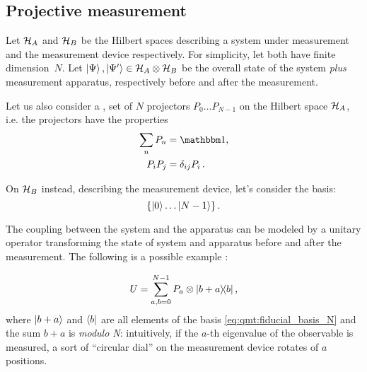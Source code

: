 \subsection{Projective measurement}\label{sec:qmt:projm}

Let $\mathcal{H}_A$ and $\mathcal{H}_B$ be the Hilbert spaces describing
a system under measurement and the measurement device respectively.
For simplicity, let both have finite di\-mension~$N$.
Let $\ket{\Psi}, \ket{\Psi'} \in \mathcal{H}_{A} \otimes \mathcal{H}_{B}$
be the overall state of the
system \emph{plus} measurement apparatus, 
respectively before and after the measurement.

Let us also consider a ,  set of $N$ projectors
$P_0 \dots P_{N-1}$ on the Hilbert space $\mathcal{H}_A$,
i.e. the projectors have the properties
\begin{align}\label{eq:qmt:decomposition-id-proj}
  \sum_n P_n  &= \idop \text{,}\\
  P_i P_j     &= \delta_{ij}P_i \, \text{.}
\end{align}

On $\mathcal{H}_B$ instead, describing the measurement device, let's consider
the
basis:
\begin{equation}\label{eq:qmt:fiducial_basis_N}
  \left\{\ket{0} \dots \ket{N-1}\right\} \text{.}
\end{equation}

The coupling between the system and the apparatus
can be modeled by
a unitary operator
transforming the state of system and apparatus before and after the measurement.
The following is a possible
example \parencite[.1 ``Orthogonal Measurements'']{PreskillNotes}:

\begin{equation}\label{eq:unitary_measurement}
  U = \sum_{a, b = 0}^{N-1} P_a \otimes \ketbra{b+a}{b} \text{,}
\end{equation}
where 
$\ket{b+a}$ and $\bra{b}$ are all elements of the basis \eqref{eq:qmt:fiducial_basis_N}
and
the sum $b+a$ is \emph{modulo N}:
intuitively, if the $a$-th eigenvalue of the observable is measured,
a sort of ``circular dial''
on the measurement device rotates of $a$ positions.

